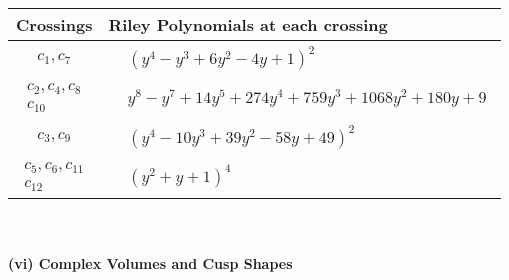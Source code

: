 \documentclass[1p]{elsarticle_modified}
\theoremstyle{definition}
\begin{document}
\begin{tabular}{m{50pt}|m{274pt}}
Crossings & \hspace{64pt}Riley Polynomials at each crossing \\
\hline $$\begin{aligned}c_{1},c_{7}\end{aligned}$$&$\begin{aligned}
&(y^4- y^3+6 y^2-4 y+1)^2
\end{aligned}$\\
\hline $$\begin{aligned}c_{2},c_{4},c_{8}\\c_{10}\end{aligned}$$&$\begin{aligned}
&y^8- y^7+14 y^5+274 y^4+759 y^3+1068 y^2+180 y+9
\end{aligned}$\\
\hline $$\begin{aligned}c_{3},c_{9}\end{aligned}$$&$\begin{aligned}
&(y^4-10 y^3+39 y^2-58 y+49)^2
\end{aligned}$\\
\hline $$\begin{aligned}c_{5},c_{6},c_{11}\\c_{12}\end{aligned}$$&$\begin{aligned}
&(y^2+y+1)^4
\end{aligned}$\\
\hline
\end{tabular}\\~\\
\newpage\flushleft \textbf{(vi) Complex Volumes and Cusp Shapes}
\end{document}
